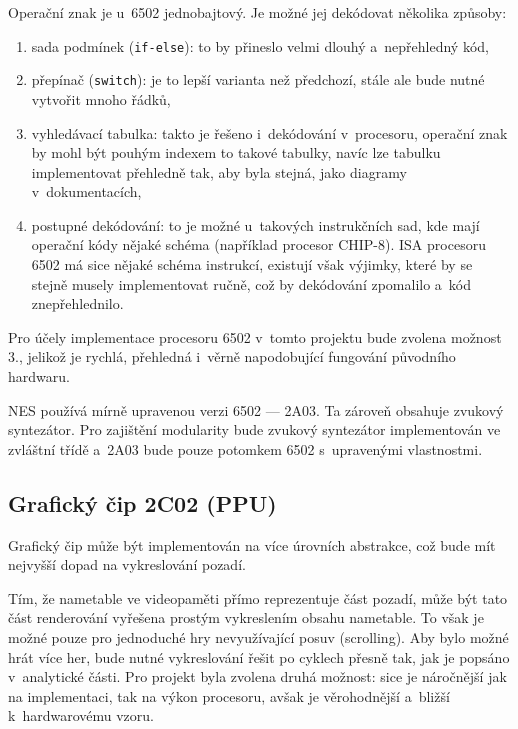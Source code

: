 Operační znak je u~6502 jednobajtový. Je možné jej dekódovat několika způsoby:
\begin{enumerate}
	\item sada podmínek (\texttt{if-else}): to by přineslo velmi dlouhý a~nepřehledný kód,
	\item přepínač (\texttt{switch}): je to lepší varianta než předchozí, stále ale bude nutné vytvořit mnoho řádků,
	\item vyhledávací tabulka: takto je řešeno i~dekódování v~procesoru, operační znak by mohl být pouhým indexem to takové tabulky, navíc lze tabulku implementovat přehledně tak, aby byla stejná, jako diagramy v~dokumentacích,
	\item postupné dekódování: to je možné u~takových instrukčních sad, kde mají operační kódy nějaké schéma (například procesor CHIP-8). ISA procesoru 6502 má sice nějaké schéma instrukcí, existují však výjimky, které by se stejně musely implementovat ručně, což by dekódování zpomalilo a~kód znepřehlednilo.
\end{enumerate}

Pro účely implementace procesoru 6502 v~tomto projektu bude zvolena možnost 3., jelikož je rychlá, přehledná i~věrně napodobující fungování původního hardwaru.

NES používá mírně upravenou verzi 6502 --- 2A03. Ta zároveň obsahuje zvukový syntezátor. Pro zajištění modularity bude zvukový syntezátor implementován ve zvláštní třídě a~2A03 bude pouze potomkem 6502 s~upravenými vlastnostmi.

\subsection{Grafický čip 2C02 (PPU)}
Grafický čip může být implementován na více úrovních abstrakce, což bude mít nejvyšší dopad na vykreslování pozadí.

Tím, že nametable ve videopaměti přímo reprezentuje část pozadí, může být tato část renderování vyřešena prostým vykreslením obsahu nametable. To však je možné pouze pro jednoduché hry nevyužívající posuv (scrolling). Aby bylo možné hrát více her, bude nutné vykreslování řešit po cyklech přesně tak, jak je popsáno v~analytické části. Pro projekt byla zvolena druhá možnost: sice je náročnější jak na implementaci, tak na výkon procesoru, avšak je věrohodnější a~bližší k~hardwarovému vzoru.

